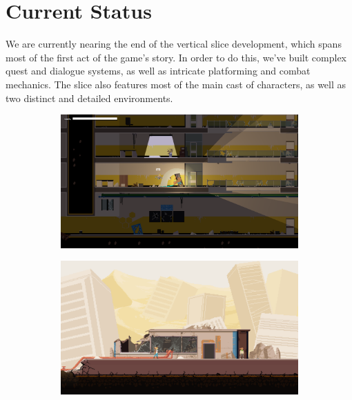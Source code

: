 \section{Current Status}
We are currently nearing the end of the vertical slice development, which spans most of the first act of the game's story. In order to do this, we've built complex quest and dialogue systems, as well as intricate platforming and combat mechanics. The slice also features most of the main cast of characters, as well as two distinct and detailed environments.

\begin{figure}[h]
  \centering
  \begin{subfigure}[b]{0.60\textwidth}
    \centering
    \includegraphics[width=\textwidth]{../press/screenshot 1.png}
  \end{subfigure}
  \begin{subfigure}[b]{0.35\textwidth}
    \centering
    \includegraphics[width=\textwidth]{../press/screenshot 8.png}
  \end{subfigure}
  \vskip -0.5cm
  \begin{subfigure}[t]{0.35\textwidth}\vskip 0pt

\end{subfigure}
\end{figure}
